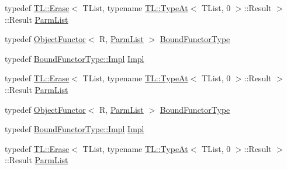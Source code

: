 \begin{DoxyCompactItemize}
\item 
typedef \mbox{\hyperlink{structUtil_1_1TL_1_1Erase}{T\+L\+::\+Erase}}$<$ T\+List, typename \mbox{\hyperlink{structUtil_1_1TL_1_1TypeAt}{T\+L\+::\+Type\+At}}$<$ T\+List, 0 $>$\+::Result $>$\+::Result \mbox{\hyperlink{structUtil_1_1Private_1_1BinderFirstTraits_3_01ObjectFunctor_3_01R_00_01TList_01_4_01_4_a181ef1a7b945beef449f25ba47f49bbc}{Parm\+List}}
\item 
typedef \mbox{\hyperlink{classUtil_1_1ObjectFunctor}{Object\+Functor}}$<$ R, \mbox{\hyperlink{structUtil_1_1Private_1_1BinderFirstTraits_3_01ObjectFunctor_3_01R_00_01TList_01_4_01_4_a181ef1a7b945beef449f25ba47f49bbc}{Parm\+List}} $>$ \mbox{\hyperlink{structUtil_1_1Private_1_1BinderFirstTraits_3_01ObjectFunctor_3_01R_00_01TList_01_4_01_4_af907df4f7fd610d891e8b4eabc0a7c39}{Bound\+Functor\+Type}}
\item 
typedef \mbox{\hyperlink{classUtil_1_1ObjectFunctor_a93fc635194d1d2768e73ba87d03abd8d}{Bound\+Functor\+Type\+::\+Impl}} \mbox{\hyperlink{structUtil_1_1Private_1_1BinderFirstTraits_3_01ObjectFunctor_3_01R_00_01TList_01_4_01_4_a44a122ba86e6d28d35849d5dbea18984}{Impl}}
\item 
typedef \mbox{\hyperlink{structUtil_1_1TL_1_1Erase}{T\+L\+::\+Erase}}$<$ T\+List, typename \mbox{\hyperlink{structUtil_1_1TL_1_1TypeAt}{T\+L\+::\+Type\+At}}$<$ T\+List, 0 $>$\+::Result $>$\+::Result \mbox{\hyperlink{structUtil_1_1Private_1_1BinderFirstTraits_3_01ObjectFunctor_3_01R_00_01TList_01_4_01_4_a181ef1a7b945beef449f25ba47f49bbc}{Parm\+List}}
\item 
typedef \mbox{\hyperlink{classUtil_1_1ObjectFunctor}{Object\+Functor}}$<$ R, \mbox{\hyperlink{structUtil_1_1Private_1_1BinderFirstTraits_3_01ObjectFunctor_3_01R_00_01TList_01_4_01_4_a181ef1a7b945beef449f25ba47f49bbc}{Parm\+List}} $>$ \mbox{\hyperlink{structUtil_1_1Private_1_1BinderFirstTraits_3_01ObjectFunctor_3_01R_00_01TList_01_4_01_4_af907df4f7fd610d891e8b4eabc0a7c39}{Bound\+Functor\+Type}}
\item 
typedef \mbox{\hyperlink{classUtil_1_1ObjectFunctor_a93fc635194d1d2768e73ba87d03abd8d}{Bound\+Functor\+Type\+::\+Impl}} \mbox{\hyperlink{structUtil_1_1Private_1_1BinderFirstTraits_3_01ObjectFunctor_3_01R_00_01TList_01_4_01_4_a44a122ba86e6d28d35849d5dbea18984}{Impl}}
\item 
typedef \mbox{\hyperlink{structUtil_1_1TL_1_1Erase}{T\+L\+::\+Erase}}$<$ T\+List, typename \mbox{\hyperlink{structUtil_1_1TL_1_1TypeAt}{T\+L\+::\+Type\+At}}$<$ T\+List, 0 $>$\+::Result $>$\+::Result \mbox{\hyperlink{structUtil_1_1Private_1_1BinderFirstTraits_3_01ObjectFunctor_3_01R_00_01TList_01_4_01_4_a181ef1a7b945beef449f25ba47f49bbc}{Parm\+List}}

\end{DoxyCompactItemize}
